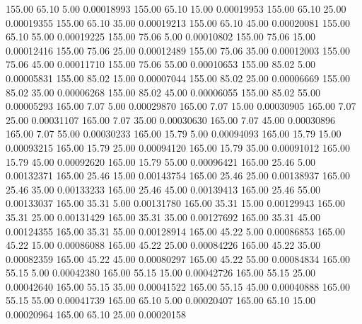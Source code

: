     155.00     65.10      5.00     0.00018993
    155.00     65.10     15.00     0.00019953
    155.00     65.10     25.00     0.00019355
    155.00     65.10     35.00     0.00019213
    155.00     65.10     45.00     0.00020081
    155.00     65.10     55.00     0.00019225
    155.00     75.06      5.00     0.00010802
    155.00     75.06     15.00     0.00012416
    155.00     75.06     25.00     0.00012489
    155.00     75.06     35.00     0.00012003
    155.00     75.06     45.00     0.00011710
    155.00     75.06     55.00     0.00010653
    155.00     85.02      5.00     0.00005831
    155.00     85.02     15.00     0.00007044
    155.00     85.02     25.00     0.00006669
    155.00     85.02     35.00     0.00006268
    155.00     85.02     45.00     0.00006055
    155.00     85.02     55.00     0.00005293
    165.00      7.07      5.00     0.00029870
    165.00      7.07     15.00     0.00030905
    165.00      7.07     25.00     0.00031107
    165.00      7.07     35.00     0.00030630
    165.00      7.07     45.00     0.00030896
    165.00      7.07     55.00     0.00030233
    165.00     15.79      5.00     0.00094093
    165.00     15.79     15.00     0.00093215
    165.00     15.79     25.00     0.00094120
    165.00     15.79     35.00     0.00091012
    165.00     15.79     45.00     0.00092620
    165.00     15.79     55.00     0.00096421
    165.00     25.46      5.00     0.00132371
    165.00     25.46     15.00     0.00143754
    165.00     25.46     25.00     0.00138937
    165.00     25.46     35.00     0.00133233
    165.00     25.46     45.00     0.00139413
    165.00     25.46     55.00     0.00133037
    165.00     35.31      5.00     0.00131780
    165.00     35.31     15.00     0.00129943
    165.00     35.31     25.00     0.00131429
    165.00     35.31     35.00     0.00127692
    165.00     35.31     45.00     0.00124355
    165.00     35.31     55.00     0.00128914
    165.00     45.22      5.00     0.00086853
    165.00     45.22     15.00     0.00086088
    165.00     45.22     25.00     0.00084226
    165.00     45.22     35.00     0.00082359
    165.00     45.22     45.00     0.00080297
    165.00     45.22     55.00     0.00084834
    165.00     55.15      5.00     0.00042380
    165.00     55.15     15.00     0.00042726
    165.00     55.15     25.00     0.00042640
    165.00     55.15     35.00     0.00041522
    165.00     55.15     45.00     0.00040888
    165.00     55.15     55.00     0.00041739
    165.00     65.10      5.00     0.00020407
    165.00     65.10     15.00     0.00020964
    165.00     65.10     25.00     0.00020158
